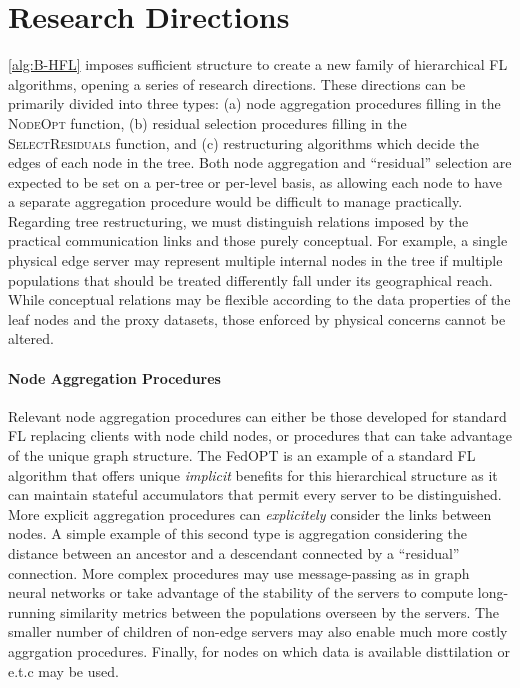 \section{Research Directions}
\cref{alg:B-HFL} imposes sufficient structure to create a new family of hierarchical FL algorithms, opening a series of research directions. These directions can be primarily divided into three types: (a) node aggregation procedures filling in the \textsc{NodeOpt} function, (b) residual selection procedures filling in the \textsc{SelectResiduals} function, and (c) restructuring algorithms which decide the edges of each node in the tree. Both node aggregation and ``residual'' selection are expected to be set on a per-tree or per-level basis, as allowing each node to have a separate aggregation procedure would be difficult to manage practically. Regarding tree restructuring, we must distinguish relations imposed by the practical communication links and those purely conceptual. For example, a single physical edge server may represent multiple internal nodes in the tree if multiple populations that should be treated differently fall under its geographical reach. While conceptual relations may be flexible according to the data properties of the leaf nodes and the proxy datasets, those enforced by physical concerns cannot be altered.

\paragraph{Node Aggregation Procedures} Relevant node aggregation procedures can either be those developed for standard FL replacing clients with node child nodes, or procedures that can take advantage of the unique graph structure. The FedOPT is an example of a standard FL algorithm that offers unique \emph{implicit} benefits for this hierarchical structure as it can maintain stateful accumulators that permit every server to be distinguished. More explicit aggregation procedures can \emph{explicitely} consider the links between nodes. A simple example of this second type is aggregation considering the distance between an ancestor and a descendant connected by a ``residual'' connection. More complex procedures may use message-passing as in graph neural networks  or take advantage of the stability of the servers to compute long-running similarity metrics between the populations overseen by the servers. The smaller number of children of non-edge servers may also enable much more costly aggrgation procedures. Finally, for nodes on which data is available disttilation or e.t.c may be used.
